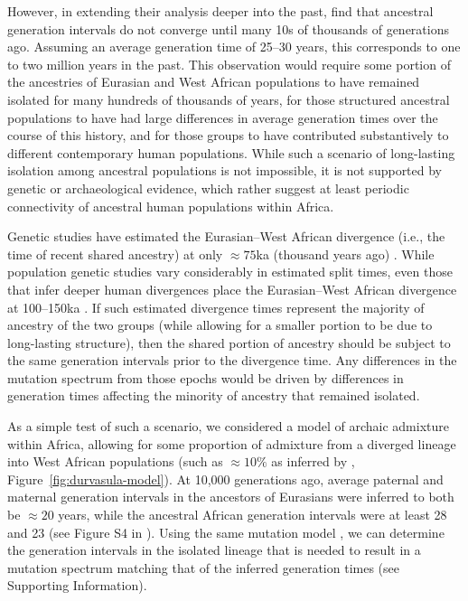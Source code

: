\documentclass[]{article}
\begin{document}
However, in extending their analysis deeper into the past,
\citet{wang2023human} find that ancestral generation intervals do not converge
until many 10s of thousands of generations ago. Assuming an average generation
time of 25--30 years, this corresponds to one to two million years in the past.
This observation would require some portion of the ancestries of Eurasian and
West African populations to have remained isolated for many hundreds of
thousands of years, for those structured ancestral populations to have had
large differences in average generation times over the course of this history,
and for those groups to have contributed substantively to different
contemporary human populations. While such a scenario of long-lasting isolation
among ancestral populations is not impossible, it is not supported by genetic
\citep[e.g.,][]{ragsdale2023weakly} or archaeological
\citep[e.g.,][]{scerri2018did} evidence, which rather suggest at least periodic
connectivity of ancestral human populations within Africa.

Genetic studies have estimated the Eurasian--West African divergence (i.e., the
time of recent shared ancestry) at only $\approx 75$ka (thousand years ago)
\citep[e.g.,][]{pagani2015tracing,bergstrom2020insights}. While population
genetic studies vary considerably in estimated split times, even those that
infer deeper human divergences place the Eurasian--West African divergence at
100--150ka \citep[e.g.,][]{schlebusch2017southern}. If such estimated
divergence times represent the majority of ancestry of the two groups (while
allowing for a smaller portion to be due to long-lasting structure), then the
shared portion of ancestry should be subject to the same generation intervals
prior to the divergence time. Any differences in the mutation spectrum from
those epochs would be driven by differences in generation times affecting the
minority of ancestry that remained isolated. 

As a simple test of such a scenario, we considered a model of archaic admixture
within Africa, allowing for some proportion of admixture from a diverged
lineage into West African populations (such as $\approx10\%$ as inferred by
\citet{durvasula2020recovering}, Figure~\ref{fig:durvasula-model}). At 10,000
generations ago, average paternal and maternal generation intervals in the
ancestors of Eurasians were inferred to both be $\approx20$ years, while the
ancestral African generation intervals were at least 28 and 23 (see Figure S4
in \citet{wang2023human}). Using the same mutation model
\citep{jonsson2017parental}, we can determine the generation intervals in the
isolated lineage that is needed to result in a mutation spectrum matching that
of the inferred generation times (see Supporting Information).
\end{document}

